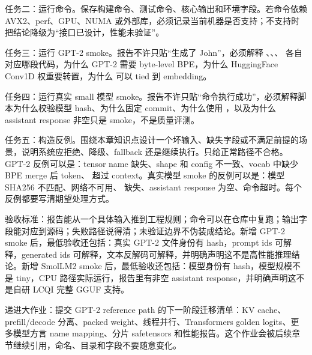 任务二：运行命令。保存构建命令、测试命令、核心输出和环境字段。若命令依赖 AVX2、perf、GPU、NUMA 或外部库，必须记录当前机器是否支持；不支持时把结论降级为“接口已设计，性能未验证”。

任务三：运行 GPT-2 smoke。报告不许只贴“生成了 John”，必须解释 、、、 各自对应哪段代码，为什么 GPT-2 需要 byte-level BPE，为什么 HuggingFace Conv1D 权重要转置，为什么  可以 tied 到 embedding。

任务四：运行真实 small 模型 smoke。报告不许只贴“命令执行成功”，必须解释脚本为什么校验模型 hash、为什么固定  commit、为什么使用 ，以及为什么 assistant response 非空只是 smoke，不是质量评测。

任务五：构造反例。围绕本章知识点设计一个坏输入、缺失字段或不满足前提的场景，说明系统应拒绝、降级、fallback 还是继续执行。只给正常路径不合格。GPT-2 反例可以是：tensor name 缺失、shape 和 config 不一致、vocab 中缺少 BPE merge 后 token、 超过 context。真实模型 smoke 的反例可以是：模型 SHA256 不匹配、网络不可用、 缺失、assistant response 为空、命令超时。每个反例都要写清期望处理方式。


验收标准：报告能从一个具体输入推到工程规则；命令可以在仓库中复跑；输出字段能对应到源码；失败路径说得清；未验证边界不伪装成结论。新增 GPT-2 smoke 后，最低验收还包括：真实 GPT-2 文件身份有 hash，prompt ids 可解释，generated ids 可解释，文本反解码可解释，并明确声明这不是高性能推理结论。新增 SmolLM2 smoke 后，最低验收还包括：模型身份有 hash，模型规模不是 tiny，CPU 路径实际运行，报告里有非空 assistant response，并明确声明这不是自研 LCQI 完整 GGUF 支持。

递进大作业：提交 GPT-2 reference path 的下一阶段迁移清单：KV cache、prefill/decode 分离、packed weight、线程并行、Transformers golden logits、更多模型方言 name mapping、分片 safetensors 和性能报告。这个作业会被后续章节继续引用，命名、目录和字段不要随意变化。
